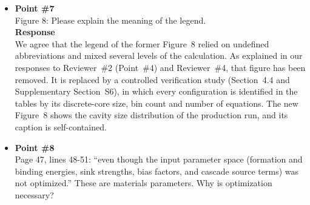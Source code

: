 \documentclass{article}
\newcommand{\hkl}[1]{\langle #1\rangle}
\newcommand{\half}{\tfrac{1}{2}}
\begin{document}
\begin{itemize}
\textbf{Response}\\
We agree that this was a significant omission, which Reviewer~\#4 also noted. The former Figure~7 (mean loop and cavity sizes compared with experiment) has been replaced by Figure~3, which shows the dose evolution of the number densities and mean diameters of the $\half\hkl{111}$ loop, $\hkl{100}$ loop and cavity populations, with the EUROFER97 neutron data overlaid. Section~4.1 analyzes this figure in detail:
\begin{itemize}
    \item the six observables are scored quantitatively at 15.72~dpa (Table~2);
    \item the dose trajectory of each population is discussed;
    \item the non-monotonic mean $\hkl{100}$ diameter is explained;
    \item the comparison with the SANS cavity data is discussed;
    \item the limits of the comparison are stated.
\end{itemize}
The new Figure~7 (concentrations of the interstitial size classes and vacancy content per size bin) is described in Section~4.3.

\item \textbf{Point \#7}\\
Figure 8: Please explain the meaning of the legend.\\

\textbf{Response}\\
We agree that the legend of the former Figure~8 relied on undefined abbreviations and mixed several levels of the calculation. As explained in our responses to Reviewer~\#2 (Point~\#4) and Reviewer~\#4, that figure has been removed. It is replaced by a controlled verification study (Section~4.4 and Supplementary Section~S6), in which every configuration is identified in the tables by its discrete-core size, bin count and number of equations. The new Figure~8 shows the cavity size distribution of the production run, and its caption is self-contained.

\item \textbf{Point \#8}\\
Page 47, lines 48-51: ``even though the input parameter space (formation and binding energies, sink strengths, bias factors, and cascade source terms) was not optimized.'' These are materials parameters. Why is optimization necessary?\\


\end{itemize}
\end{document}
